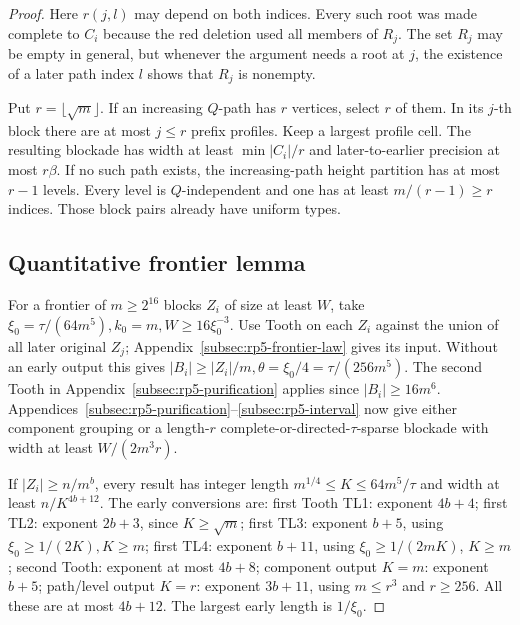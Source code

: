\documentclass[11pt,a4paper]{article}
\theoremstyle{definition}
\theoremstyle{remark}
\numberwithin{equation}{section}
\begin{document}
\begin{proof}
Here \(r(j,\allowbreak l)\) may depend on both indices. Every such root was made complete to \(C_{i}\) because the red deletion used all members of \(R_{j}\). The set \(R_{j}\) may be empty in general, but whenever the argument needs a root at \(j\), the existence of a later path index \(l\) shows that \(R_{j}\) is nonempty.

Put \(r=\lfloor \sqrt{m}\rfloor\). If an increasing \(Q\)-path has \(r\) vertices, select \(r\) of them. In its \(j\)-th block there are at most \(j\le\allowbreak r\) prefix profiles. Keep a largest profile cell. The resulting blockade has width at least \(\min |C_{i}|/r\) and later-to-earlier precision at most \(r \beta\). If no such path exists, the increasing-path height partition has at most \(r-1\) levels. Every level is \(Q\)-independent and one has at least \(m/(r-1)\ge\allowbreak r\) indices. Those block pairs already have uniform types.
\subsection{Quantitative frontier lemma}\label{subsec:rp5-quantitative}
For a frontier of \(m\ge\allowbreak 2^{16}\) blocks \(Z_{i}\) of size at least \(W\), take \(\xi_{0}=\tau/(64m^{5}),\allowbreak  k_{0}=m,\allowbreak  W\ge\allowbreak 16\xi_{0}^{-3}\). Use Tooth on each \(Z_{i}\) against the union of all later original \(Z_{j}\); Appendix~\ref{subsec:rp5-frontier-law} gives its input. Without an early output this gives \(|B_{i}|\ge\allowbreak |Z_{i}|/m,\allowbreak  \theta=\xi_{0}/4=\tau/(256m^{5})\). The second Tooth in Appendix~\ref{subsec:rp5-purification} applies since \(|B_{i}|\ge\allowbreak 16m^{6}\). Appendices~\ref{subsec:rp5-purification}--\ref{subsec:rp5-interval} now give either component grouping or a length-\(r\) complete-or-directed-\(\tau\)-sparse blockade with width at least \(W/(2m^{3} r)\).

If \(|Z_{i}|\ge\allowbreak n/m^{b}\), every result has integer length \(m^{1/4}\le\allowbreak K\le\allowbreak 64m^{5}/\tau\) and width at least \(n/K^{4b+12}\). The early conversions are: first Tooth TL1: exponent \(4b+4\); first TL2: exponent \(2b+3\), since \(K\ge\allowbreak \sqrt{m}\); first TL3: exponent \(b+5\), using \(\xi_{0}\ge\allowbreak 1/(2K),\allowbreak  K\ge\allowbreak m\); first TL4: exponent \(b+11\), using \(\xi_{0}\ge 1/(2mK)\), \(K\ge m\); second Tooth: exponent at most \(4b+8\); component output \(K=m\): exponent \(b+5\); path/level output \(K=r\): exponent \(3b+11\), using \(m\le\allowbreak r^{3}\) and \(r\ge\allowbreak 256\). All these are at most \(4b+12\). The largest early length is \(1/\xi_{0}\).


\end{proof}
\end{document}
